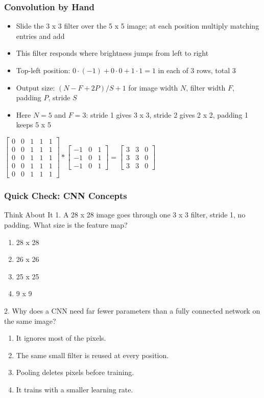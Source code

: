 \begin{frame}[fragile]\frametitle{Convolution by Hand}
\begin{itemize}
\item Slide the 3 x 3 filter over the 5 x 5 image; at each position multiply matching entries and add
\item This filter responds where brightness jumps from left to right
\item Top-left position: $0\cdot(-1) + 0\cdot 0 + 1\cdot 1 = 1$ in each of 3 rows, total 3
\item Output size: $(N - F + 2P)/S + 1$ for image width $N$, filter width $F$, padding $P$, stride $S$
\item Here $N=5$ and $F=3$: stride 1 gives 3 x 3, stride 2 gives 2 x 2, padding 1 keeps 5 x 5
\end{itemize}
\begin{center}
\footnotesize
$\begin{bmatrix}0&0&1&1&1\\0&0&1&1&1\\0&0&1&1&1\\0&0&1&1&1\\0&0&1&1&1\end{bmatrix}
\ast
\begin{bmatrix}-1&0&1\\-1&0&1\\-1&0&1\end{bmatrix}
=
\begin{bmatrix}3&3&0\\3&3&0\\3&3&0\end{bmatrix}$
\end{center}
\end{frame}

\begin{frame}[fragile]\frametitle{Quick Check: CNN Concepts}
\begin{block}{Think About It}
1. A 28 x 28 image goes through one 3 x 3 filter, stride 1, no padding. What size is the feature map?
\begin{enumerate}
  \item[A.] 28 x 28
  \item[B.] 26 x 26
  \item[C.] 25 x 25
  \item[D.] 9 x 9
\end{enumerate}
2. Why does a CNN need far fewer parameters than a fully connected network on the same image?
\begin{enumerate}
  \item[A.] It ignores most of the pixels.
  \item[B.] The same small filter is reused at every position.
  \item[C.] Pooling deletes pixels before training.
  \item[D.] It trains with a smaller learning rate.
\end{enumerate}
\end{block}
\end{frame}

